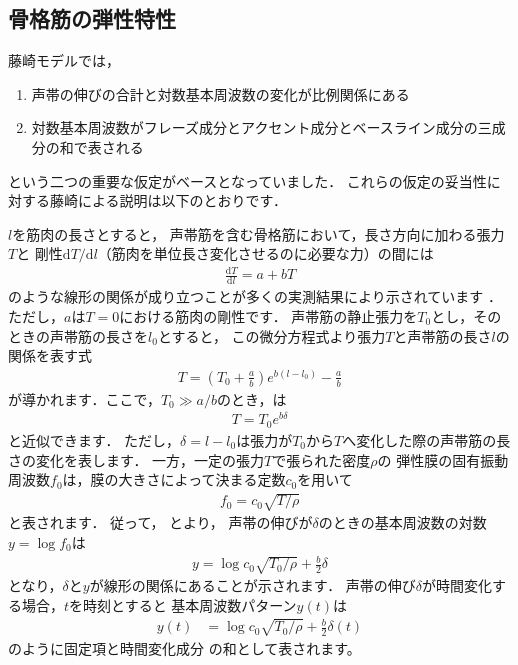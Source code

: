 \subsection{骨格筋の弾性特性}

藤崎モデルでは，
\begin{enumerate}
\item 声帯の伸びの合計と対数基本周波数の変化が比例関係にある
\item 対数基本周波数がフレーズ成分とアクセント成分とベースライン成分の三成分の和で表される
\end{enumerate}
という二つの重要な仮定がベースとなっていました．
これらの仮定の妥当性に対する藤崎による説明は以下のとおりです．

$l$を筋肉の長さとすると，
声帯筋を含む骨格筋において，長さ方向に加わる張力$T$と
剛性${\mbox{d}T}/{\mbox{d}l}$（筋肉を単位長さ変化させるのに必要な力）の間には
\begin{align}
\frac{\mbox{d}T}{\mbox{d}l} = a + b T
\end{align}
のような線形の関係が成り立つことが多くの実測結果により示されています
\cite{Buchthal1944,Sandow1958}．
ただし，$a$は$T=0$における筋肉の剛性です．
声帯筋の静止張力を$T_0$とし，そのときの声帯筋の長さを$l_0$とすると，
この微分方程式より張力$T$と声帯筋の長さ$l$の関係を表す式
\begin{align}
T = \left(T_0 + \frac{a}{b}\right) e^{b(l-l_0)} - \frac{a}{b}
\label{eq:stress-strain}
\end{align}
が導かれます．ここで，$T_0 \gg a/b$のとき，は
\begin{align}
T = T_0 e^{b\delta}
\label{eq:stress-strain2}
\end{align}
と近似できます．
ただし，$\delta = l-l_0$は張力が$T_0$から$T$へ変化した際の声帯筋の長さの変化を表します．
一方，一定の張力$T$で張られた密度$\rho$の
弾性膜の固有振動周波数$f_0$は，膜の大きさによって決まる定数$c_0$を用いて
\begin{align}
f_0 = c_0 \sqrt{T/\rho}
\label{eq:F0_tension}
\end{align}
と表されます．
従って，
とより，
声帯の伸びが$\delta$のときの基本周波数の対数$y = \log f_0$は
\begin{align}
y = \log c_0 \sqrt{T_0/\rho} + \frac{b}{2}\delta
\end{align}
となり，$\delta$と$y$が線形の関係にあることが示されます．
声帯の伸び$\delta$が時間変化する場合，$t$を時刻とすると
基本周波数パターン$y(t)$は
\begin{align}
y(t) &= \log c_0 \sqrt{T_0/\rho} + \frac{b}{2}\delta(t)
\end{align}
のように固定項と時間変化成分
の和として表されます。

